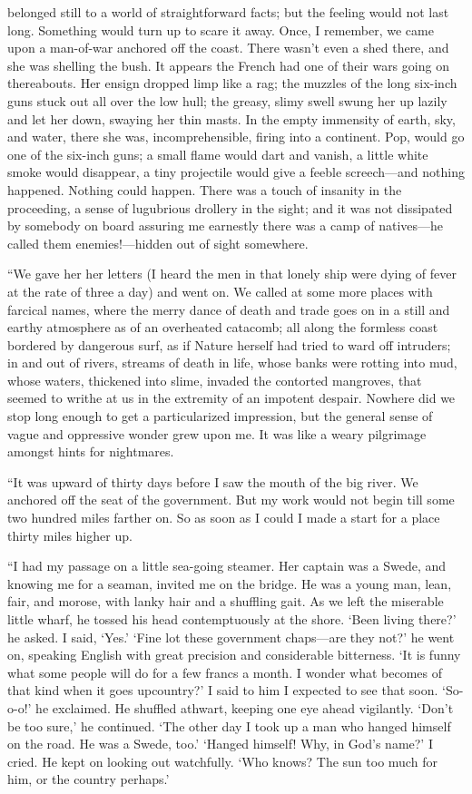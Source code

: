 \documentclass[12pt]{report}
\begin{document}
belonged still to a world of straightforward facts; but the feeling
would not last long. Something would turn up to scare it away. Once, I
remember, we came upon a man-of-war anchored off the coast. There wasn't
even a shed there, and she was shelling the bush. It appears the French
had one of their wars going on thereabouts. Her ensign dropped limp like
a rag; the muzzles of the long six-inch guns stuck out all over the low
hull; the greasy, slimy swell swung her up lazily and let her down,
swaying her thin masts. In the empty immensity of earth, sky, and water,
there she was, incomprehensible, firing into a continent. Pop, would go
one of the six-inch guns; a small flame would dart and vanish, a little
white smoke would disappear, a tiny projectile would give a feeble
screech---and nothing happened. Nothing could happen. There was a touch
of insanity in the proceeding, a sense of lugubrious drollery in the
sight; and it was not dissipated by somebody on board assuring me
earnestly there was a camp of natives---he called them enemies!---hidden
out of sight somewhere.

``We gave her her letters (I heard the men in that lonely ship were
dying of fever at the rate of three a day) and went on. We called at
some more places with farcical names, where the merry dance of death and
trade goes on in a still and earthy atmosphere as of an overheated
catacomb; all along the formless coast bordered by dangerous surf, as if
Nature herself had tried to ward off intruders; in and out of rivers,
streams of death in life, whose banks were rotting into mud, whose
waters, thickened into slime, invaded the contorted mangroves, that
seemed to writhe at us in the extremity of an impotent despair. Nowhere
did we stop long enough to get a particularized impression, but the
general sense of vague and oppressive wonder grew upon me. It was like a
weary pilgrimage amongst hints for nightmares.

``It was upward of thirty days before I saw the mouth of the big river.
We anchored off the seat of the government. But my work would not begin
till some two hundred miles farther on. So as soon as I could I made a
start for a place thirty miles higher up.

``I had my passage on a little sea-going steamer. Her captain was a
Swede, and knowing me for a seaman, invited me on the bridge. He was a
young man, lean, fair, and morose, with lanky hair and a shuffling gait.
As we left the miserable little wharf, he tossed his head contemptuously
at the shore. `Been living there?' he asked. I said, `Yes.' `Fine lot
these government chaps---are they not?' he went on, speaking English
with great precision and considerable bitterness. `It is funny what some
people will do for a few francs a month. I wonder what becomes of that
kind when it goes upcountry?' I said to him I expected to see that soon.
`So-o-o!' he exclaimed. He shuffled athwart, keeping one eye ahead
vigilantly. `Don't be too sure,' he continued. `The other day I took up
a man who hanged himself on the road. He was a Swede, too.' `Hanged
himself! Why, in God's name?' I cried. He kept on looking out
watchfully. `Who knows? The sun too much for him, or the country
perhaps.'
\end{document}
